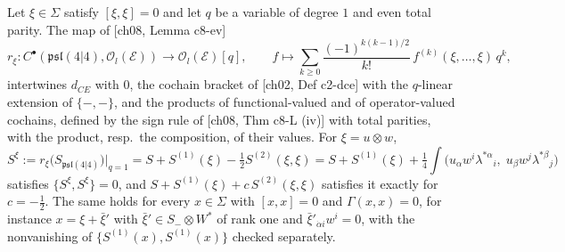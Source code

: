 \begin{lemma}
\label{lem:o-ev}
Let $\xi\in\Sigma$ satisfy $[\xi,\xi]=0$ and let $q$ be a variable of degree $1$ and even total parity. The map of [ch08, Lemma c8-ev]
\begin{equation}
r_\xi\colon C^\bullet(\mathfrak{psl}(4|4),\mathscr O_l(\mathscr E))\to\mathscr O_l(\mathscr E)[q],\qquad f\mapsto\sum_{k\ge0}\frac{(-1)^{k(k-1)/2}}{k!}\,f^{(k)}(\xi,\dots,\xi)\,q^k,
\label{eq:o-ev}
\end{equation}
intertwines $d_{CE}$ with $0$, the cochain bracket of [ch02, Def c2-dce] with the $q$-linear extension of $\{-,-\}$, and the products of functional-valued and of operator-valued cochains, defined by the sign rule of [ch08, Thm c8-L (iv)] with total parities, with the product, resp.\ the composition, of their values. For $\xi=u\otimes w$,
\begin{equation}
S^\xi:=r_\xi\big(S_{\mathfrak{psl}(4|4)}\big)\big|_{q=1}=S+S^{(1)}(\xi)-\tfrac12S^{(2)}(\xi,\xi)=S+S^{(1)}(\xi)+\tfrac14\int\big(u_\alpha w^i\lambda^{*\alpha}{}_i,\;u_\beta w^j\lambda^{*\beta}{}_j\big)
\label{eq:o-twistaction}
\end{equation}
satisfies $\{S^\xi,S^\xi\}=0$, and $S+S^{(1)}(\xi)+c\,S^{(2)}(\xi,\xi)$ satisfies it exactly for $c=-\tfrac12$. The same holds for every $x\in\Sigma$ with $[x,x]=0$ and $\Gamma(x,x)=0$, for instance $x=\xi+\bar\xi'$ with $\bar\xi'\in S_-\otimes W^*$ of rank one and $\bar\xi'_{\dot\alpha i}w^i=0$, with the nonvanishing of $\{S^{(1)}(x),S^{(1)}(x)\}$ checked separately.
\end{lemma}

